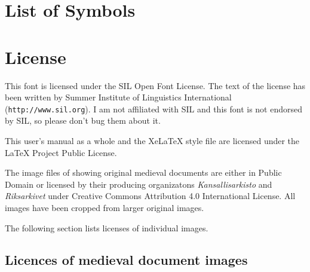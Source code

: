 \documentclass[a4paper]{article}
\begin{document}
\section{List of Symbols}

\label{pg:symbols_start}

\label{pg:symbols_end}


\section{License}

This font is licensed under the SIL Open Font License. The text of the
license has been written by Summer Institute of Linguistics
International (\texttt{http://www.sil.org}). I am not affiliated with
SIL and this font is not endorsed by SIL, so please don't bug them
about it. 

This user's manual as a whole and the XeLaTeX style file are licensed
under the LaTeX Project Public License.

The image files of showing original medieval documents are either in
Public Domain or licensed by their producing organizatons
\emph{Kansallisarkisto} and \emph{Riksarkivet} under Creative Commons
Attribution 4.0 International License. All images have been cropped
from larger original images.

The following section lists licenses of individual images. 
 
\subsection*{Licences of medieval document images}
\label{image_license_start}
\end{document}
